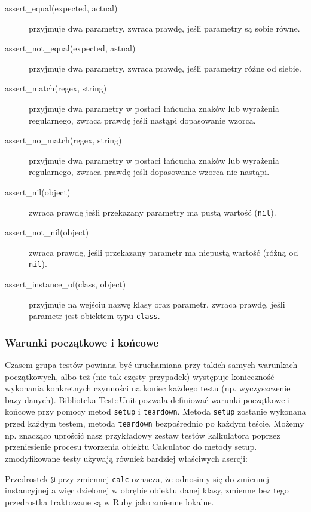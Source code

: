      \begin{description}
       \item[assert\_equal(expected, actual)] przyjmuje dwa parametry, zwraca prawdę, jeśli parametry są sobie równe.
       \item[assert\_not\_equal(expected, astual)] przyjmuje dwa parametry, zwraca prawdę, jeśli parametry różne od siebie.
       \item[assert\_match(regex, string)] przyjmuje dwa parametry w postaci łańcucha znaków lub wyrażenia regularnego, zwraca prawdę jeśli nastąpi dopasowanie wzorca.
       \item[assert\_no\_match(regex, string)] przyjmuje dwa parametry w postaci łańcucha znaków lub wyrażenia regularnego, zwraca prawdę jeśli dopasowanie wzorca nie nastąpi.
       \item[assert\_nil(object)] zwraca prawdę jeśli przekazany parametry ma pustą wartość (\texttt{nil}).
       \item[assert\_not\_nil(object)] zwraca prawdę, jeśli przekazany parametr ma niepustą wartość (różną od \texttt{nil}).
       \item[assert\_instance\_of(class, object)] przyjmuje na wejściu nazwę klasy oraz parametr, zwraca prawdę, jeśli parametr jest obiektem typu \texttt{class}.
    \end{description}
    
    \subsubsection{Warunki początkowe i końcowe}
    Czasem grupa testów powinna być uruchamiana przy takich samych warunkach początkowych, albo też (nie tak częsty przypadek) występuje konieczność wykonania konkretnych czynności na koniec każdego testu (np. wyczyszczenie bazy danych). Biblioteka Test::Unit pozwala definiować warunki początkowe i końcowe przy pomocy metod \texttt{setup} i \texttt{teardown}.
    Metoda \texttt{setup} zostanie wykonana przed każdym testem, metoda \texttt{teardown} bezpośrednio po każdym teście. Możemy np. znacząco uprościć nasz przykładowy zestaw testów kalkulatora poprzez przeniesienie procesu tworzenia obiektu Calculator do metody setup. zmodyfikowane testy używają również bardziej właściwych asercji:
    
    
    
    Przedrostek \texttt{@} przy zmiennej \texttt{calc} oznacza, że odnosimy się do zmiennej instancyjnej a więc dzielonej w obrębie obiektu danej klasy, zmienne bez tego przedrostka traktowane są w Ruby jako zmienne lokalne.
    
